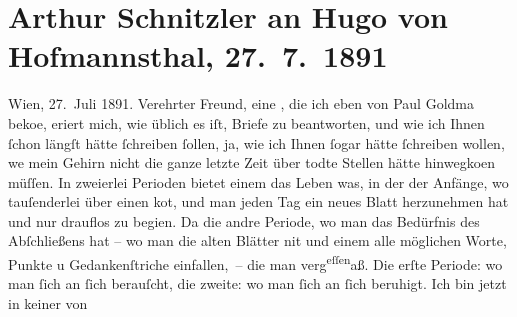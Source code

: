                \section[Arthur Schnitzler an Hugo von Hofmannsthal, 27. 7. 1891]{ Arthur Schnitzler an Hugo von Hofmannsthal, 27. 7. 1891}\nopagebreak{}\rehead{ }\begin{ledgroupsized}[t]{13cm}\normalsize\beginnumbering \toendnotes[C]{\smallbreak\pagebreak[2]} 
\toendnotes[C]{\smallbreak}\pstart
           \raggedleft{}{\pb}Wien, 27. Juli
                  1891.\pend
           \pstart
           Verehrter Freund, eine \label{K_L00025-1v}\label{K_L00025-1h}, die ich eben von Paul Goldma{\geminationn} beko{\geminationm}e, eri{\geminationn}ert mich,
               wie üblich es iſt, Briefe zu beantworten, und wie ich Ihnen ſchon längſt hätte
               ſchreiben ſollen, ja, wie ich Ihnen ſogar hätte ſchreiben wollen, we{\geminationn} mein Gehirn nicht die ganze letzte Zeit über todte
               Stellen hätte hinwegko{\geminationm}en müſſen. In zweierlei Perioden
               bietet einem das Leben was, in der der Anfänge, wo tauſenderlei über einen ko{\geminationm}t, und man {\pb}jeden Tag ein
               neues Blatt herzunehmen hat und nur drauflos zu begi{\geminationn}en.
                  Da{\geminationn} die andre Periode, wo man das Bedürfnis des
               Abſchließens hat – wo man die alten Blätter ni{\geminationm}t und
               einem alle möglichen Worte, Punkte u Gedankenſtriche einfallen, – die man verg\substVorne{}\textsuperscript{eſſen}\substDazwischen{}aß\substHinten{}{ }. Die erſte Periode: wo man ſich an ſich
               berauſcht, die zweite: wo man ſich an ſich beruhigt. Ich bin jetzt in keiner von

\end{ledgroupsized}
